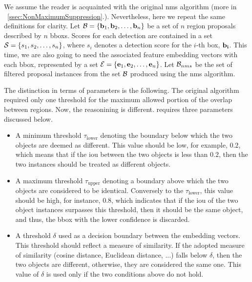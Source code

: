 We assume the reader is acquainted with the original \gls{nms} algorithm (more in \sectionstr{}~\ref{ssec:NonMaximumSuppression}.). Nevertheless, here we repeat the same definitions for clarity. Let $\mathcal{B} = \left\{ {\mathbf{b}_1, \mathbf{b}_2, \dots, \mathbf{b}_n} \right\}$ be a set of $n$ region proposals described by $n$ \glspl{bbox}. Scores for each detection are contained in a set $\mathcal{S} = \left\{ {s_1, s_2, \dots, s_n} \right\}$, where $s_i$ denotes a detection score for the $i$-th box, $\mathbf{b_i}$. This time, we are also going to need the associated feature embedding vectors with each \gls{bbox}, represented by a set $\mathcal{E} = \left\{ {\mathbf{e}_1, \mathbf{e}_2, \dots, \mathbf{e}_n} \right\}$. Let $\mathcal{B}_{nms}$ be  the set of filtered proposal instances from the set $\mathcal{B}$ produced using the \gls{nms} algorithm.

\def\threshlower{\tau_{\text{lower}}}
\def\threshupper{\tau_{\text{upper}}}
\def\threshsim{\delta}

The distinction in terms of parameters is the following. The original algorithm required only one threshold for the maximum allowed portion of the overlap between regions. Now, the reasonining is different. \featurenms{} requires three parameters discussed below.
\begin{itemize}
    \item A minimum threshold $\threshlower$ denoting the boundary below which the two objects are deemed as different. This value should be low, for example, $0.2$, which means that if the \gls{iou} between the two objects is less than $0.2$, then the two instances should be treated as different objects.
    \item A maximum threshold $\threshupper$ denoting a boundary above which the two objects are considered to be identical. Conversely to the $\threshlower$, this value should be high, for instance, $0.8$, which indicates that if the \gls{iou} of the two object instances surpasses this threshold, then it should be the same object, and thus, the \gls{bbox} with the lower confidence is discarded.
    \item A threshold $\threshsim$ used as a decision boundary between the embedding vectors. This threshold should reflect a measure of similarity. If the adopted measure of similarity (cosine distance, Euclidean distance, ...) falls below $\threshsim$, then the two objects are different, otherwise, they are considered the same one. This value of $\threshsim$ is used only if the two conditions above do not hold.
\end{itemize}

